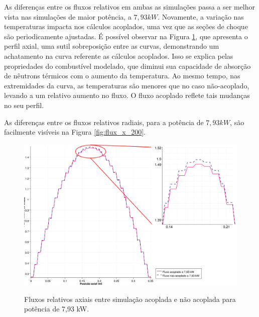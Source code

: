 As diferenças entre os fluxos relativos em ambas as simulações passa a ser melhor
vista nas simulações de maior potência, a $7,93 kW$. Novamente, a variação nas temperaturas
impacta nos cálculos acoplados, uma vez que as seções de choque são periodicamente
ajustadas. É possível observar na Figura \ref{fig:flux_z_200}, que apresenta o perfil axial,
uma sutil sobreposição entre as curvas, demonstrando um achatamento na curva
referente as cálculos acoplados. Isso se explica pelas propriedades do combustível modelado,
que diminui sua capacidade de absorção de nêutrons térmicos com o aumento da temperatura.
Ao mesmo tempo, nas extremidades da curva, as temperaturas são menores que no caso não-acoplado,
levando a um relativo aumento no fluxo. O fluxo acoplado reflete tais mudanças no seu perfil.

As diferenças entre os fluxos relativos radiais, para a potência de $7,93 kW$, são facilmente
visíveis na Figura \ref{fig:flux_x_200}.

\begin{figure}[htb]
  \caption{Fluxos relativos axiais entre simulação acoplada e não acoplada para
    potência de 7,93 kW.}
  \centering\includegraphics[scale=0.5]{figuras/Flux_rel_z_200_port_trabalhado.png}
  \label{fig:flux_z_200}
\end{figure}

